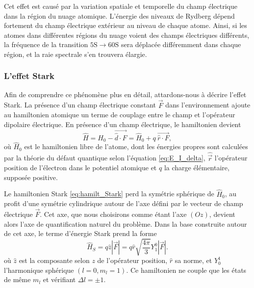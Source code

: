 Cet effet est causé par la variation spatiale et temporelle du champ électrique dans la région du nuage atomique.
L'énergie des niveaux de Rydberg dépend fortement du champ électrique extérieur au niveau de chaque atome.
Ainsi, si les atomes dans différentes régions du nuage voient des champs électriques différents, la fréquence de la transition $\mathrm{5S}\rightarrow\mathrm{60S}$ sera déplacée différemment dans chaque région, et la raie spectrale s'en trouvera élargie.

	\subsubsection*{L'effet Stark}
\noindent Afin de comprendre ce phénomène plus en détail, attardons-nous à décrire l'effet Stark.
La présence d'un champ électrique constant $\vec{F}$ dans l'environnement ajoute au hamiltonien atomique un terme de couplage entre le champ et l'opérateur dipolaire électrique.
En présence d'un champ électrique, le hamiltonien devient
\begin{equation}
\label{eq:hamilt_Stark}
\hat{H} = \hat{H}_0 - \vec{\hat{d} \cdot F} = \hat{H}_0 + q~\vec{\hat{r}\cdot F},
\end{equation}
où $\hat{H}_0$ est le hamiltonien libre de l'atome, dont les énergies propres sont calculées par la théorie du défaut quantique selon l'équation \eqref{eq:E_I_delta}, $\hat{\vec{r}}$ l'opérateur position de l'électron dans le potentiel atomique et $q$ la charge élémentaire, supposée positive.

Le hamiltonien Stark \eqref{eq:hamilt_Stark} perd la symétrie sphérique de $\hat{H}_0$, au profit d'une symétrie cylindrique autour de l'axe défini par le vecteur de champ électrique $\vec{F}$.
Cet axe, que nous choisirons comme étant l'axe $(Oz)$, devient alors l'axe de quantification naturel du problème.
Dans la base construite autour de cet axe, le terme d'énergie Stark prend la forme
\begin{equation}
\label{eq:dipole_Stark}
\hat{H}_S = q\hat{z}|\vec{F}| = q\hat{r} \sqrt{\frac{4\pi}{3}} Y_1^0  |\vec{F}|.
\end{equation}
où $\hat{z}$ est la composante selon $z$ de l'opérateur position, $\hat{r}$ sa norme, et $Y_0^1$ l'harmonique sphérique $(l=0,m_l=1)$.
Ce hamiltonien ne couple que les états de même $m_l$ et vérifiant $\Delta l = \pm 1$.

